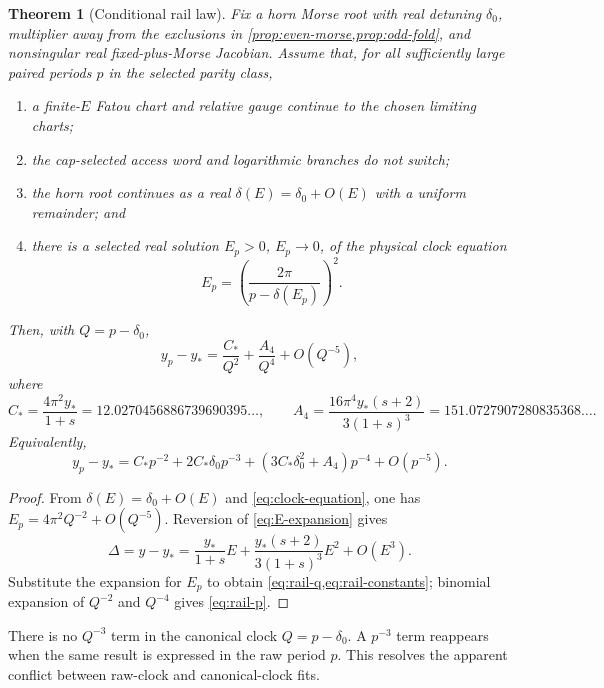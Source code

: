 \documentclass[11pt]{article}
\newtheorem{theorem}{Theorem}[section]
\theoremstyle{definition}
\theoremstyle{remark}
\begin{document}
\begin{theorem}[Conditional rail law]\label{thm:conditional-rail}
Fix a horn Morse root with real detuning $\delta_0$, multiplier away from the exclusions in \cref{prop:even-morse,prop:odd-fold}, and nonsingular real fixed-plus-Morse Jacobian.  Assume that, for all sufficiently large paired periods $p$ in the selected parity class,
\begin{enumerate}[label=(H\arabic*),leftmargin=2.8em]
  \item a finite-$E$ Fatou chart and relative gauge continue to the chosen limiting charts;
  \item the cap-selected access word and logarithmic branches do not switch;
  \item the horn root continues as a real $\delta(E)=\delta_0+O(E)$ with a uniform remainder; and
  \item there is a selected real solution $E_p>0$, $E_p\to0$, of the physical clock equation
  \begin{equation}
    E_p=\left(\frac{2\pi}{p-\delta(E_p)}\right)^2.
    \label{eq:clock-equation}
  \end{equation}
\end{enumerate}
Then, with $Q=p-\delta_0$,
\begin{equation}
  y_p-y_*=\frac{C_*}{Q^2}+\frac{A_4}{Q^4}+O(Q^{-5}),
  \label{eq:rail-q}
\end{equation}
where
\begin{equation}
  C_*=\frac{4\pi^2y_*}{1+s}
  =12.0270456886739690395\ldots,
  \qquad
  A_4=\frac{16\pi^4y_*(s+2)}{3(1+s)^3}
  =151.0727907280835368\ldots.
  \label{eq:rail-constants}
\end{equation}
Equivalently,
\begin{equation}
  y_p-y_*=C_*p^{-2}+2C_*\delta_0p^{-3}
  +(3C_*\delta_0^2+A_4)p^{-4}+O(p^{-5}).
  \label{eq:rail-p}
\end{equation}
\end{theorem}

\begin{proof}
From $\delta(E)=\delta_0+O(E)$ and \cref{eq:clock-equation}, one has $E_p=4\pi^2Q^{-2}+O(Q^{-5})$.  Reversion of \cref{eq:E-expansion} gives
\[
  \Delta=y-y_*=\frac{y_*}{1+s}E
  +\frac{y_*(s+2)}{3(1+s)^3}E^2+O(E^3).
\]
Substitute the expansion for $E_p$ to obtain \cref{eq:rail-q,eq:rail-constants}; binomial expansion of $Q^{-2}$ and $Q^{-4}$ gives \cref{eq:rail-p}.
\end{proof}

There is no $Q^{-3}$ term in the canonical clock $Q=p-\delta_0$.  A $p^{-3}$ term reappears when the same result is expressed in the raw period $p$.  This resolves the apparent conflict between raw-clock and canonical-clock fits.
\end{document}
